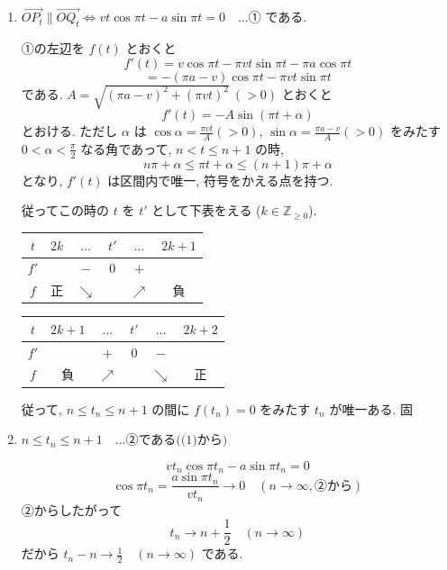 \documentclass[../main.tex]{subfiles}
\begin{document}
\begin{enumerate}
  \item[(1)] $\vec{OP_t} \parallel \vec{O Q_t} \iff v t \cos \pi t - a \sin \pi t = 0 \quad \dots \text{① である.}$

    ①の左辺を $f(t)$ とおくと
    \[
      f'(t) = v \cos \pi t - \pi v t \sin \pi t - \pi a \cos \pi t
    \]
    \[
      = -(\pi a - v) \cos \pi t - \pi v t \sin \pi t
    \]
    である. $A = \sqrt{(\pi a - v)^2 + (\pi v t)^2} \ (>0)$ とおくと
    \[
      f'(t) = -A \sin(\pi t + \alpha)
    \]
    とおける. ただし $\alpha$ は $\cos \alpha = \frac{\pi v t}{A} (>0)$, $\sin \alpha = \frac{\pi a - v}{A} (>0)$ をみたす $0 < \alpha < \frac{\pi}{2}$ なる角であって, $n < t \le n+1$ の時,
    \[
      n\pi + \alpha \le \pi t + \alpha \le (n+1)\pi + \alpha
    \]
    となり, $f'(t)$ は区間内で唯一, 符号をかえる点を持つ.

    従ってこの時の $t$ を $t'$ として下表をえる ($k \in \mathbb{Z}_{\ge 0}$).

    \begin{center}
      \begin{tabular}{c|c|c|c|c|c}
        $t$ & $2k$ & $\dots$ & $t'$ & $\dots$ & $2k+1$ \\ \hline
        $f'$ & & $-$ & $0$ & $+$ & \\ \hline
        $f$ & 正 & $\searrow$ & & $\nearrow$ & 負
      \end{tabular}
      \hspace{2em}
      \begin{tabular}{c|c|c|c|c|c}
        $t$ & $2k+1$ & $\dots$ & $t'$ & $\dots$ & $2k+2$ \\ \hline
        $f'$ & & $+$ & $0$ & $-$ & \\ \hline
        $f$ & 負 & $\nearrow$ & & $\searrow$ & 正
      \end{tabular}
    \end{center}

    従って, $n \le t_n \le n+1$ の間に $f(t_n) = 0$ をみたす $t_n$ が唯一ある. \hfill 固

  \item[(2)] $n \le t_n \le n+1 \quad \dots \text{②である((1)から)}$

    \[
      v t_n \cos \pi t_n - a \sin \pi t_n = 0
    \]
    \[
      \cos \pi t_n = \frac{a \sin \pi t_n}{v t_n} \to 0 \quad (n \to \infty, \text{②から})
    \]
    ②からしたがって
    \[
      t_n \to n + \frac{1}{2} \quad (n \to \infty)
    \]
    だから $t_n - n \to \frac{1}{2} \quad (n \to \infty)$ である.
\end{enumerate}
\end{document}
